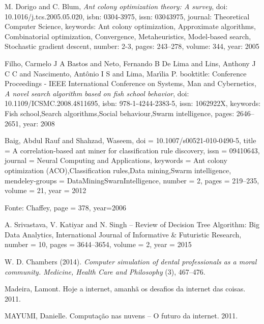 \documentclass[conference,compsoc]{IEEEtran}
\begin{document}
\begin{thebibliography}{1}
M. Dorigo and C. Blum,
\emph{Ant colony optimization theory: A survey},
doi: {10.1016/j.tcs.2005.05.020},
isbn: {0304-3975},
issn: {03043975},
journal: {Theoretical Computer Science},
keywords: {Ant colony optimization, Approximate algorithms, Combinatorial optimization, Convergence, Metaheuristics, Model-based search, Stochastic gradient descent},
number: {2-3},
pages: {243--278},
volume: {344},
year: {2005}

Filho, Carmelo J A Bastos and Neto, Fernando B De Lima and Lins, Anthony J C C and Nascimento, Ant\^{o}nio I S and Lima, Mar\'{\i}lia P.
booktitle: {Conference Proceedings - IEEE International Conference on Systems, Man and Cybernetics},
\emph{A novel search algorithm based on fish school behavior},
doi: {10.1109/ICSMC.2008.4811695},
isbn: {978-1-4244-2383-5},
issn: {1062922X},
keywords: {Fish school,Search algorithms,Social behaviour,Swarm intelligence},
pages: {2646--2651},
year: {2008}

Baig, Abdul Rauf and Shahzad, Waseem,
doi = {10.1007/s00521-010-0490-5},
title = {{A correlation-based ant miner for classification rule discovery}},
issn = {09410643},
journal = {Neural Computing and Applications},
keywords = {Ant colony optimization (ACO),Classification rules,Data mining,Swarm intelligence},
mendeley-groups = {DataMiningSwarnIntelligence},
number = {2},
pages = {219--235},
volume = {21},
year = {2012}


Fonte: Chaffey,
page = 378,
year=2006


A. Srivastava, V. Katiyar and N. Singh -- Review of Decision Tree Algorithm: Big Data Analytics,
International Journal of Informative \& Futuristic Research,
number = {10},
pages = {3644--3654},
volume = {2},
year = {2015}

W. D. Chambers (2014).
\emph{Computer simulation of dental professionals as a moral community. Medicine, Health Care and Philosophy}
(3), 467–476.




Madeira, Lamont. Hoje a internet, amanhã os desafios da internet das coisas. 2011.

MAYUMI, Danielle. Computação nas nuvens – O futuro da internet. 2011.



\end{thebibliography}






\end{document}
